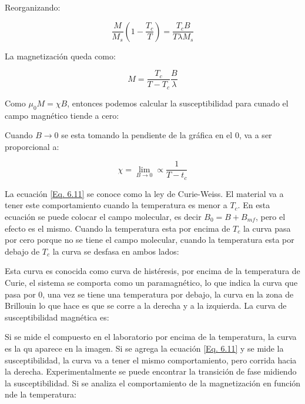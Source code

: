 \documentclass[11pt,fleqn]{book}
\begin{document}
Reorganizando:

\begin{equation*}
    \frac{M}{M_{s}}\left(1-\frac{T_{c}}{T}\right)=\frac{T_{c}B}{T\lambda M_{s}}
\end{equation*}

La magnetización queda como:

\begin{equation}
        M=\frac{T_{c}}{T-T_{c}}\frac{B}{\lambda}
    \label{Eq. 6.10}
\end{equation}

Como $\mu_{0}M=\chi B$, entonces podemos calcular la susceptibilidad para cunado el campo magnético tiende a cero:

        
Cuando $B\longrightarrow0$ se esta tomando la pendiente de la gráfica en el $0$, va a ser proporcional a:

\begin{equation}
        \chi=\lim_{B\longrightarrow0}\propto\frac{1}{T-t_{c}}
    \label{Eq. 6.11}
\end{equation}

La ecuación \ref{Eq. 6.11} se conoce como la ley de Curie-Weiss. El material va a tener este comportamiento cuando la temperatura es menor a $T_{c}$. En esta ecuación se puede colocar el campo molecular, es decir $B_{0}=B+B_{mf}$, pero el efecto es el mismo. Cuando la temperatura esta por encima de $T_{c}$  la curva pasa por cero porque no se tiene el campo molecular, cuando la temperatura esta por debajo de $T_{c}$ la curva se desfasa en ambos lados:


Esta curva es conocida como curva de histéresis, por encima de la temperatura de Curie, el sistema se comporta como un paramagnético, lo que indica la curva que pasa por $0$, una vez se tiene una temperatura por debajo, la curva en la zona de Brillouin lo que hace es que se corre a la derecha y a la izquierda. La curva de susceptibilidad magnética es:


Si se mide el compuesto en el laboratorio por encima de la temperatura, la curva es la qu aparece en la imagen. Si se agrega la ecuación \ref{Eq. 6.11} y se mide la susceptibilidad, la curva va a tener el mismo comportamiento, pero corrida hacia la derecha. Experimentalmente se puede encontrar la transición de fase midiendo la susceptibilidad. Si se analiza el comportamiento de la magnetización en función nde la temperatura:
\end{document}
